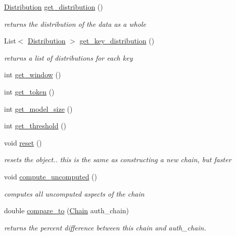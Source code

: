 \begin{DoxyCompactItemize}
\hyperlink{classcomponents_1_1_distribution}{Distribution} \hyperlink{classcomponents_1_1_chain_ae3cf3859627624dd155cf1507514cf20}{get\+\_\+distribution} ()
\begin{DoxyCompactList}\small\item\em returns the distribution of the data as a whole \end{DoxyCompactList}\item 
List$<$ \hyperlink{classcomponents_1_1_distribution}{Distribution} $>$ \hyperlink{classcomponents_1_1_chain_a654c25d3edab107ad77710428f11280c}{get\+\_\+key\+\_\+distribution} ()
\begin{DoxyCompactList}\small\item\em returns a list of distributions for each key \end{DoxyCompactList}\item 
int \hyperlink{classcomponents_1_1_chain_a1eb6b4a7d6cb462910932e29b3ab732e}{get\+\_\+window} ()
\item 
int \hyperlink{classcomponents_1_1_chain_ac6aca5adf04bb1500c1d8735cd7d5881}{get\+\_\+token} ()
\item 
int \hyperlink{classcomponents_1_1_chain_a545c320b4e5cc5e150ec6b07f8870fa1}{get\+\_\+model\+\_\+size} ()
\item 
int \hyperlink{classcomponents_1_1_chain_a128ee372728530d787a9512350dad405}{get\+\_\+threshold} ()
\item 
void \hyperlink{classcomponents_1_1_chain_a620eea641b4a673af78000c2ef5af576}{reset} ()
\begin{DoxyCompactList}\small\item\em resets the object.. this is the same as constructing a new chain, but faster \end{DoxyCompactList}\item 
void \hyperlink{classcomponents_1_1_chain_a401a39b68da4ae8ba64e02af94e68f15}{compute\+\_\+uncomputed} ()
\begin{DoxyCompactList}\small\item\em computes all uncomputed aspects of the chain \end{DoxyCompactList}\item 
double \hyperlink{classcomponents_1_1_chain_ab23f30bde8f169d73c3a3e5588bf75c6}{compare\+\_\+to} (\hyperlink{classcomponents_1_1_chain}{Chain} auth\+\_\+chain)
\begin{DoxyCompactList}\small\item\em returns the percent difference between this chain and auth\+\_\+chain. \end{DoxyCompactList}\item 

\end{DoxyCompactItemize}
